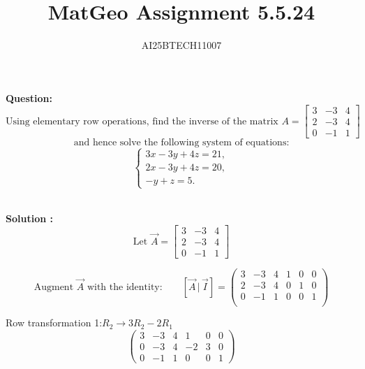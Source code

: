 \documentclass[journal]{IEEEtran}
\begin{document}

\vspace{3cm}

\title{MatGeo Assignment 5.5.24}
\author{AI25BTECH11007}
 \maketitle
{\let\newpage\relax\maketitle}

\renewcommand{\thefigure}{\theenumi}
\renewcommand{\thetable}{\theenumi}
\setlength{\intextsep}{10pt} %


\renewcommand{\thetable}{\theenumi}
\noindent
\textbf{Question:}\\
\[
\text{Using elementary row operations, find the inverse of the matrix }
A = \begin{bmatrix}
3 & -3 & 4 \\
2 & -3 & 4 \\
0 & -1 & 1
\end{bmatrix}
\]
\[
\text{and hence solve the following system of equations:}
\]
\[
\begin{cases}
3x - 3y + 4z = 21, \\
2x - 3y + 4z = 20, \\
- y + z = 5.
\end{cases}
\]

\noindent\\
\textbf{Solution :}
\[
\text{Let }\vec{A}=\begin{bmatrix}
3 & -3 & 4\\[4pt]
2 & -3 & 4\\[4pt]
0 & -1 & 1
\end{bmatrix}
\]

\[
\text{Augment } \vec{A} \text{ with the identity:}
\qquad
[\vec{A}\,|\,\vec{I}] =
\left(
\begin{array}{ccc|ccc}
3 & -3 & 4 & 1 & 0 & 0 \\[4pt]
2 & -3 & 4 & 0 & 1 & 0 \\[4pt]
0 & -1 & 1 & 0 & 0 & 1 \\
\end{array}
\right)
\]

Row transformation 1:\quad $R_2 \to 3R_2 - 2R_1$
\[
\left(
\begin{array}{ccc|ccc}
3 & -3 & 4 & 1 & 0 & 0 \\[4pt]
0 & -3 & 4 & -2 & 3 & 0 \\[4pt]
0 & -1 & 1 & 0 & 0 & 1
\end{array}
\right)
\]
\end{document}
